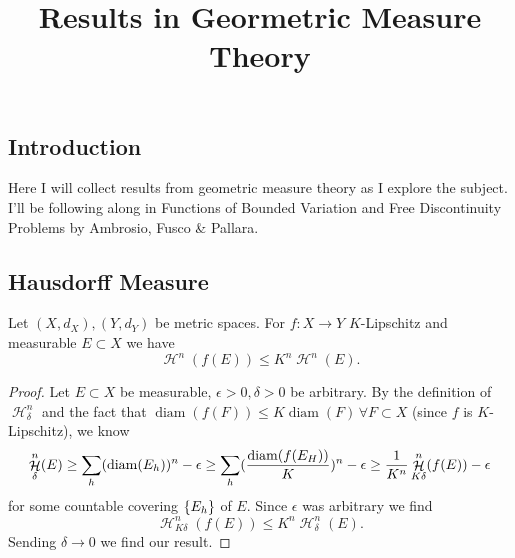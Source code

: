 \documentclass{article}
\title{Results in Geormetric Measure Theory}
\DeclareMathOperator{\diam}{diam}
\DeclareMathOperator{\hm}{\mathcal{H}}
\begin{document}
\subsection{Introduction} Here I will collect results from geometric measure theory as I explore the subject. I'll be following along in Functions of Bounded Variation and Free Discontinuity Problems by Ambrosio, Fusco \& Pallara.

\subsection{Hausdorff Measure}

\begin{lemma}\label{lem:1}
  Let $(X, d_X), (Y, d_Y)$ be metric spaces. For $f : X \to Y$ $K$-Lipschitz and measurable $E \subset X$ we have
  $$
  \hm^n(f(E)) \le K^n \hm^n(E).
  $$
\end{lemma}
\begin{proof}
  Let $E \subset X$ be measurable, $\epsilon > 0, \delta > 0$ be arbitrary. By the definition of $\hm^n_\delta$ and the fact that $\diam(f(F)) \le K \diam(F) \, \forall F \subset X$ (since $f$ is $K$-Lipschitz), we know
  $$
    \hm^n_\delta(E) \ge \sum_h \parens{\diam(E_h)}^n - \epsilon \ge \sum_h \parens{\frac{\diam(f(E_H))}{K}}^n - \epsilon \ge \frac{1}{K^n} \hm^n_{K\delta} (f(E)) - \epsilon
  $$
  for some countable covering $\{E_h\}$ of $E$. Since $\epsilon$ was arbitrary we find
  $$
    \hm^n_{K\delta} (f(E)) \le K^n\hm^n_\delta(E).
  $$
  Sending $\delta \to 0$ we find our result.
\end{proof}
\end{document}

